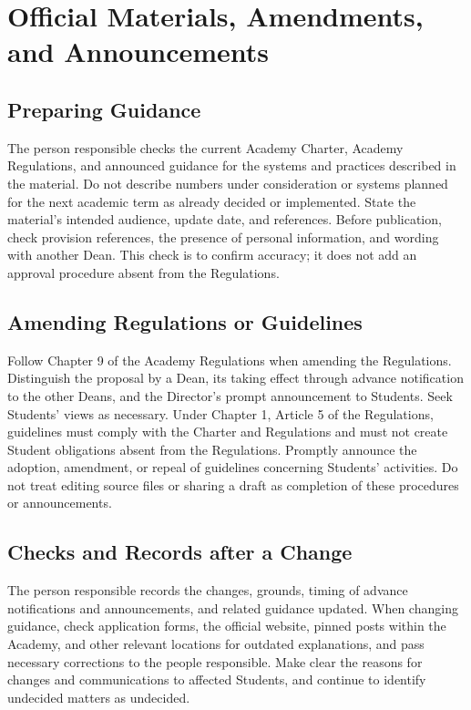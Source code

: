 \newpage
\chapter{Official Materials, Amendments, and Announcements}

\section{Preparing Guidance}

The person responsible checks the current Academy Charter, Academy Regulations, and announced guidance for the systems and practices described in the material.
Do not describe numbers under consideration or systems planned for the next academic term as already decided or implemented.
State the material's intended audience, update date, and references. Before publication, check provision references, the presence of personal information, and wording with another Dean.
This check is to confirm accuracy; it does not add an approval procedure absent from the Regulations.

\section{Amending Regulations or Guidelines}

Follow Chapter 9 of the Academy Regulations when amending the Regulations.
Distinguish the proposal by a Dean, its taking effect through advance notification to the other Deans, and the Director's prompt announcement to Students.
Seek Students' views as necessary.
Under Chapter 1, Article 5 of the Regulations, guidelines must comply with the Charter and Regulations and must not create Student obligations absent from the Regulations.
Promptly announce the adoption, amendment, or repeal of guidelines concerning Students' activities.
Do not treat editing source files or sharing a draft as completion of these procedures or announcements.

\section{Checks and Records after a Change}

The person responsible records the changes, grounds, timing of advance notifications and announcements, and related guidance updated.
When changing guidance, check application forms, the official website, pinned posts within the Academy, and other relevant locations for outdated explanations, and pass necessary corrections to the people responsible.
Make clear the reasons for changes and communications to affected Students, and continue to identify undecided matters as undecided.
